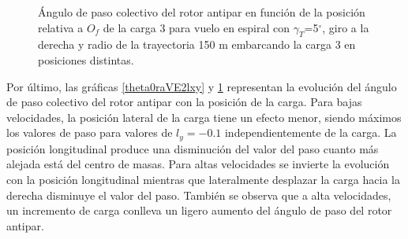 \begin{figure}
	\centering
	\caption{Ángulo de paso colectivo del rotor antipar en función de la posición relativa a $O_f$ de la carga 3 para vuelo en espiral con $\gamma_T$=5$^\circ$, giro a la derecha y radio de la trayectoria 150 m embarcando la carga 3 en posiciones distintas.}
	\label{theta0raVE3lxy}
\end{figure}

Por último, las gráficas \ref{theta0raVE2lxy} y \ref{theta0raVE3lxy} representan la evolución del ángulo de paso colectivo del rotor antipar con la posición de la carga. Para bajas velocidades, la posición lateral de la carga tiene un efecto menor, siendo máximos los valores de paso para valores de $l_y=-0.1$ independientemente de la carga. La posición longitudinal produce una disminución del valor del paso cuanto más alejada está del centro de masas.
Para altas velocidades se invierte la evolución con la posición longitudinal mientras que lateralmente desplazar la carga hacia la derecha disminuye el valor del paso.
También se observa que a alta velocidades, un incremento de carga conlleva un ligero aumento del ángulo de paso del rotor antipar.
